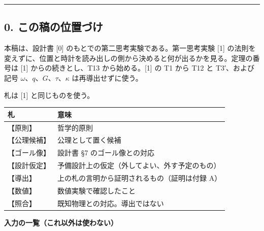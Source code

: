 \documentclass[
  a4paper,
]{ltjsarticle}
\newcounter{none} %
\begin{document}
\begin{center}\rule{0.5\linewidth}{0.5pt}\end{center}

\subsection{0.
この稿の位置づけ}\label{ux3053ux306eux7a3fux306eux4f4dux7f6eux3065ux3051}

本稿は、設計書 {[}0{]} のもとでの第二思考実験である。第一思考実験
{[}1{]}
の法則を変えずに、位置と時計を読み出しの側から決めると何が出るかを見る。定理の番号は
{[}1{]} からの続きとし、T13 から始める。{[}1{]} の T1 から T12 と
T3′、および記号 \(\omega\)、\(q\)、\(G\)、\(\tau\)、\(\kappa\)
は再導出せずに使う。

札は {[}1{]} と同じものを使う。

{\def\LTcaptype{none} %
\begin{longtable}[]{@{}ll@{}}
\toprule\noalign{}
札 & 意味 \\
\midrule\noalign{}
\endhead
\bottomrule\noalign{}
\endlastfoot
【原則】 & 哲学的原則 \\
【公理候補】 & 公理として置く候補 \\
【ゴール像】 & 設計書 §7 のゴール像との対応 \\
【設計仮定】 & 予備設計上の仮定（外してよい、外す予定のもの） \\
【導出】 & 上の札の言明から証明されるもの（証明は付録 A） \\
【数値】 & 数値実験で確認したこと \\
【照合】 & 既知物理との対応。導出ではない \\
\end{longtable}
}

\textbf{入力の一覧（これ以外は使わない）}
\end{document}
